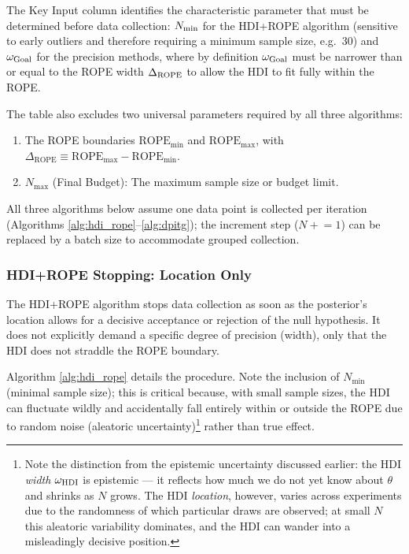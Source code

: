 The Key Input column identifies the characteristic parameter that must be determined
before data collection: $N_{\rm min}$ for the HDI+ROPE algorithm (sensitive to early outliers and
therefore requiring a minimum sample size, e.g.\ 30) and $\omega_{\rm Goal}$ for the
precision methods, where by definition $\omega_{\rm Goal}$ must be narrower than or
equal to the ROPE width $\Delta_{\rm ROPE}$ to allow the HDI to fit fully within the ROPE.

The table also excludes two universal parameters required by all three algorithms:
\begin{enumerate}[label=(\alph*)]
    \item The ROPE boundaries $\mathrm{ROPE}_\mathrm{min}$ and $\mathrm{ROPE}_\mathrm{max}$,
    with $\Delta_\mathrm{ROPE} \equiv \mathrm{ROPE}_\mathrm{max} - \mathrm{ROPE}_\mathrm{min}$.
    \item $N_\mathrm{max}$ (Final Budget): The maximum sample size or budget limit.
\end{enumerate}

All three algorithms below assume one data point is collected per iteration
(Algorithms \ref{alg:hdi_rope}--\ref{alg:dpitg});
the increment step ($N \mathrel{+}= 1$) can be replaced by a batch size to
accommodate grouped collection.

\subsubsection{HDI+ROPE Stopping: Location Only}\label{sec:hdi_rope_stopping}

The HDI+ROPE algorithm stops data collection as soon as the posterior's location allows for a decisive acceptance or rejection of the null hypothesis. It does not explicitly demand a specific degree of precision (width), only that the HDI does not straddle the ROPE boundary.

Algorithm \ref{alg:hdi_rope} details the procedure. Note the inclusion of $N_\mathrm{min}$
(minimal sample size); this is critical because, with small sample sizes, the HDI can
fluctuate wildly and accidentally fall entirely within or outside the ROPE due to random noise
(aleatoric uncertainty)\footnote{Note the distinction from the epistemic uncertainty discussed
earlier: the HDI \textit{width} $\omega_{\rm HDI}$ is epistemic --- it reflects how much we do not yet know about
$\theta$ and shrinks as $N$ grows. The HDI \textit{location}, however, varies across experiments
due to the randomness of which particular draws are observed; at small $N$ this aleatoric
variability dominates, and the HDI can wander into a misleadingly decisive position.} rather
than true effect.

